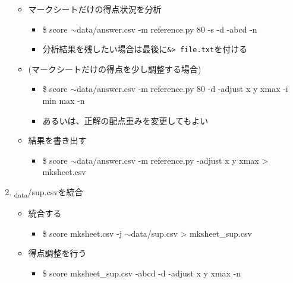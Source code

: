 \begin{enumerate}
\begin{itemize}
\begin{itemize}
\end{itemize}

\item マークシートだけの得点状況を分析

\begin{itemize}
\item \$ score \ensuremath{\sim}data\slash answer.csv -m reference.py 80 -s -d -abcd -n

\item 分析結果を残したい場合は最後に\texttt{\&> file.txt}を付ける

\end{itemize}

\item (マークシートだけの得点を少し調整する場合)

\begin{itemize}
\item \$ score \ensuremath{\sim}data\slash answer.csv -m reference.py 80 -d -adjust x y xmax -i min max -n

\item あるいは、正解の配点重みを変更してもよい

\end{itemize}

\item 結果を書き出す

\begin{itemize}
\item \$ score \ensuremath{\sim}data\slash answer.csv -m reference.py -adjust x y xmax > mksheet.csv

\end{itemize}

\end{itemize}

\item \textsubscript{data}\slash sup.csvを統合

\begin{itemize}
\item 統合する

\begin{itemize}
\item \$ score mksheet.csv -j \ensuremath{\sim}data\slash sup.csv > mksheet\_sup.csv

\end{itemize}

\item 得点調整を行う

\begin{itemize}
\item \$ score mksheet\_sup.csv -abcd -d -adjust x y xmax -n


\end{itemize}
\end{itemize}
\end{enumerate}
